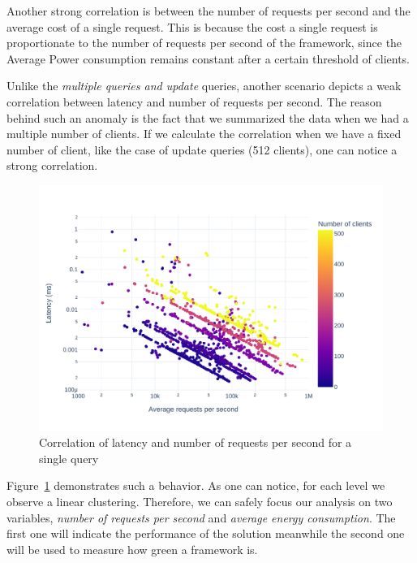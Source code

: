 Another strong correlation is between the number of requests per second and the average cost of a single request.
This is because the cost a single request is proportionate to the number of requests per second of the framework, since the Average Power consumption remains constant after a certain threshold of clients.

Unlike the \emph{multiple queries and update} queries, another scenario depicts a weak correlation between latency and number of requests per second.
The reason behind such an anomaly is the fact that we summarized the data when we had a multiple number of clients.
If we calculate the correlation when we have a fixed number of client, like the case of update queries (512 clients), one can notice a strong correlation.

\begin{figure}[bht]
    \centering
    \includegraphics[width=.9\columnwidth ]{imgs/scatter_db_latency_rps}
    \caption{Correlation of latency and number of requests per second for a single query}
    \label{fig:scatter_db}
\end{figure}

Figure~\ref{fig:scatter_db} demonstrates such a behavior.
As one can notice, for each level we observe a linear clustering.
Therefore, we can safely focus our analysis on two variables, \emph{number of requests per second} and \emph{average energy consumption}.
The first one will indicate the performance of the solution meanwhile the second one will be used to measure how green a framework is.

